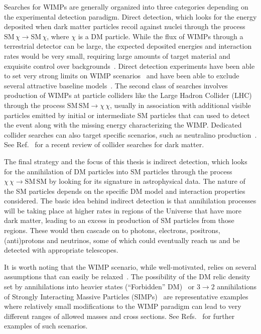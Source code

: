 Searches for WIMPs are generally organized into three categories depending on the experimental detection paradigm. Direct detection, which looks for the energy deposited when dark matter particles recoil against nuclei through the process $\text{SM}\,\chi\rightarrow\text{SM}\,\chi$, where $\chi$ is a DM particle. While the flux of WIMPs through a terrestrial detector can be large, the expected deposited energies and interaction rates would be very small, requiring large amounts of target material and exquisite control over backgrounds~\cite{Lisanti:2016jxe}. Direct detection experiments have been able to set very strong limits on WIMP scenarios~\cite{Aprile:2018dbl,Agnes:2018ves} and have been able to exclude several attractive baseline models~\cite{Escudero:2016gzx}. The second class of searches involves production of WIMPs at particle colliders like the Large Hadron Collider (LHC) through the process $\mathrm{SM}\,\mathrm{SM}\rightarrow\chi\,\chi$, usually in association with additional visible particles emitted by initial or intermediate SM particles that can used to detect the event along with the missing energy characterizing the WIMP. Dedicated collider searches can also target specific scenarios, such as neutralino production~\cite{Patrignani:2016xqp}. See Ref.~\cite{Kahlhoefer:2017dnp} for a recent review of collider searches for dark matter.

The final strategy and the focus of this thesis is indirect detection, which looks for the annihilation of DM particles into SM particles through the process $\chi\,\chi\rightarrow\mathrm{SM}\,\mathrm{SM}$ by looking for its signature in astrophysical data. The nature of the SM particles depends on the specific DM model and interaction properties considered. The basic idea behind indirect detection is that annihilation processes will be taking place at higher rates in regions of the Universe that have more dark matter, leading to an excess in production of SM particles from those regions. These would then cascade on to photons, electrons, positrons, (anti)protons and neutrinos, some of which could eventually reach us and be detected with appropriate telescopes. %

It is worth noting that the WIMP scenario, while well-motivated, relies on several assumptions that can easily be relaxed~\cite{PhysRevD.43.3191}. The possibility of the DM relic density set by annihilations into heavier states (``Forbidden'' DM)~\cite{DAgnolo:2015ujb,PhysRevD.43.3191} or $3\rightarrow2$ annihilations of Strongly Interacting Massive Particles (SIMPs)~\cite{Hochberg:2014dra,Hochberg:2014kqa} are representative examples where relatively small modifications to the WIMP paradigm can lead to very different ranges of allowed masses and cross sections. See Refs.~\cite{Berlin:2016gtr,Berlin:2016vnh,Berlin:2017ftj,Bernal:2017mqb,Cline:2017tka,DAgnolo:2015nbz,DAgnolo:2017dbv,DEramo:2010keq,Dror:2016rxc,Farina:2016llk,Kopp:2016yji,Kuflik:2015isi,Pappadopulo:2016pkp,Pospelov:2007mp} for further examples of such scenarios.

